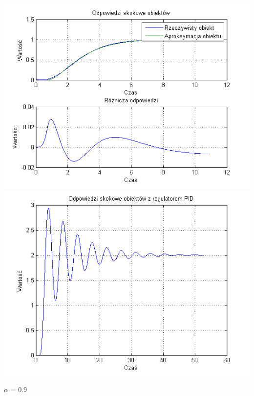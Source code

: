 \documentclass[10pt,a4paper]{article}
\begin{document}
\begin{center}
\includegraphics[scale=1]{images/dwa/skrypt_131.png}\\
\includegraphics[scale=1]{images/dwa/skrypt_132.png}\\
\end{center}
\newpage
$\alpha$ = 0.9
\end{document}
